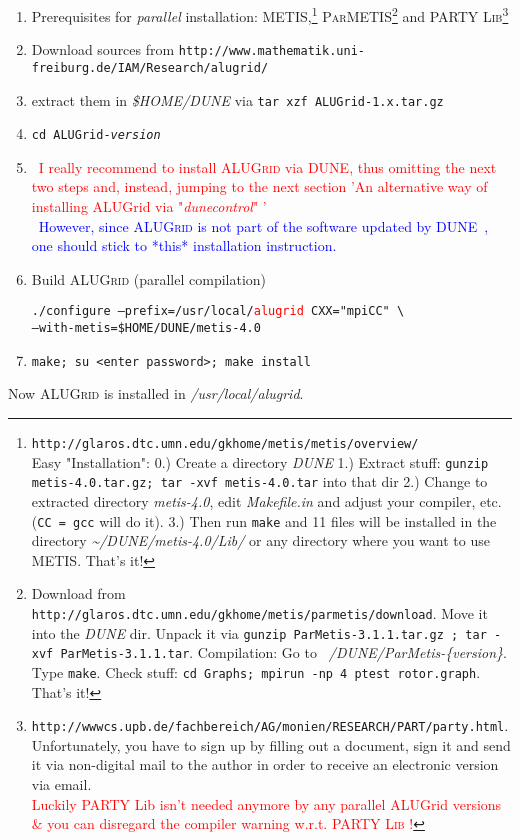 \documentclass[a4paper,12pt]{article}
\newcommand{\dune}{\textsc{DUNE}\ }
\newcommand{\dyeitred}{\textcolor{red}}{}
\newcommand{\dyeitblue}{\textcolor{blue}}{}
\begin{document}
\begin{enumerate}
 \item Prerequisites for \textit{parallel} installation:
   \textsc{METIS},\footnote{\texttt{http://glaros.dtc.umn.edu/gkhome/metis/metis/overview/}\\Easy
   "Installation": 0.) Create a directory \textit{DUNE} 1.) Extract stuff: \texttt{gunzip metis-4.0.tar.gz; tar -xvf
     metis-4.0.tar} into that dir 2.) Change to extracted directory \textit{metis-4.0}, edit \textit{Makefile.in} and adjust your compiler,
   etc. (\texttt{CC = gcc} will do it). 3.) Then run \texttt{make} and 11 files
   will be installed in the directory \textit{\textasciitilde/DUNE/metis-4.0/Lib/} or any
   directory where you want to use \textsc{METIS}. That's it!}
   \textsc{ParMETIS}\footnote{ Download from \texttt{http://glaros.dtc.umn.edu/gkhome/metis/parmetis/download}. Move it into the \textit{DUNE} dir. Unpack it via \texttt{gunzip ParMetis-3.1.1.tar.gz
; tar -xvf ParMetis-3.1.1.tar}. Compilation: Go to \textit{~/DUNE/ParMetis-\{version\}}. Type \texttt{make}. Check stuff: \texttt{cd Graphs;  mpirun -np 4 ptest rotor.graph}. That's it!}  and \textsc{PARTY
     Lib}\footnote{\texttt{http://wwwcs.upb.de/fachbereich/AG/monien/RESEARCH/PART/party.html}. Unfortunately,
   you have to sign up by filling out a document, sign it and send it via
   non-digital mail to the author in order to receive an electronic version
   via email.\\ \dyeitred{Luckily PARTY Lib isn't needed anymore by any
     parallel ALUGrid versions \& you can disregard the compiler warning
     w.r.t. \textsc{PARTY Lib} \smiley !}}
   \item Download sources from
     \texttt{http://www.mathematik.uni-freiburg.de/IAM/Research/alugrid/}
     \item extract them in \textit{\$HOME/DUNE} via \texttt{tar xzf
       ALUGrid-1.x.tar.gz}
     \item \texttt{cd ALUGrid-\textit{version}}
     \item \dyeitred{\Stopsign \ I really recommend to install \textsc{ALUGrid} via \textsc{DUNE}, thus omitting the next two steps and, instead, jumping to the next section 'An alternative way of installing ALUGrid via "\textit{dunecontrol}" '}\\
       \dyeitblue{\Stopsign \ However, since \textsc{ALUGrid} is not part of the software updated by \dune, one should stick to *this* installation instruction.}
     \item Build \textsc{ALUGrid} (parallel compilation) \begin{center}\texttt{./configure --prefix=/usr/local/\dyeitred{alugrid} CXX="mpiCC" \textbackslash \\
       --with-metis=\$HOME/DUNE/metis-4.0}
       \end{center}
      \item \texttt{make; su <enter password>; make install} 
    
\end{enumerate}
Now \textsc{ALUGrid} is installed in \textit{/usr/local/alugrid}.
\end{document}
